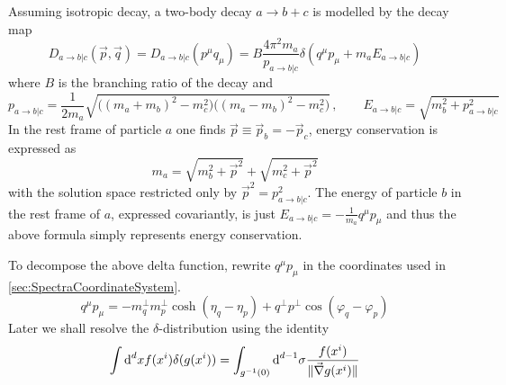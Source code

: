 Assuming isotropic decay, a two-body decay $a\rightarrow b+c$ is modelled by the decay map 
\begin{equation}
    D_{a\rightarrow b\vert c}(\vec{p},\vec{q})=D_{a\rightarrow b\vert c}(p^\mu q_\mu)=B\frac{4\pi^2 m_a}{p_{a\rightarrow b\vert c}}\delta(q^\mu p_\mu+m_a E_{a\rightarrow b\vert c})
\end{equation}
where $B$ is the branching ratio of the decay and
\begin{equation}
    p_{a\rightarrow b\vert c}=\frac{1}{2m_a}\sqrt{\big((m_a+m_b)^2-m_c^2\big)\big((m_a-m_b)^2-m_c^2\big)}\,,\qquad E_{a\rightarrow b\vert c}=\sqrt{m_b^2+p_{a\rightarrow b\vert c}^2}
\end{equation}
In the rest frame of particle $a$ one finds $\vec{p}\equiv \vec{p}_b=-\vec{p}_c$, energy conservation is expressed as
\begin{equation}
    m_a=\sqrt{m_b^2+\vec{p}^2}+\sqrt{m_c^2+\vec{p}^2}
\end{equation}
with the solution space restricted only by $\vec{p}^2=p_{a\rightarrow b\vert c}^2$. The energy of particle $b$ in the rest frame of $a$, expressed covariantly, is just $E_{a\rightarrow b\vert c}=-\frac{1}{m_a}q^\mu p_\mu$ and thus the above formula simply represents energy conservation.

To decompose the above delta function, rewrite $q^\mu p_\mu$ in the coordinates used in \ref{sec:SpectraCoordinateSystem}.
\begin{equation}
    q^\mu p_\mu=-m_q^\perp m_p^\perp\cosh(\eta_q-\eta_p)+q^\perp p^\perp\cos(\varphi_q-\varphi_p)
\end{equation}
Later we shall resolve the $\delta$-distribution using the identity
\begin{equation}
    \int\text{d}^dx f(x^i)\delta(g(x^i))=\int_{g^{-1}(0)}\text{d}^{d-1}\sigma\frac{f(x^i)}{\Vert\vec{\nabla}g(x^i)\Vert}
\end{equation}
    
